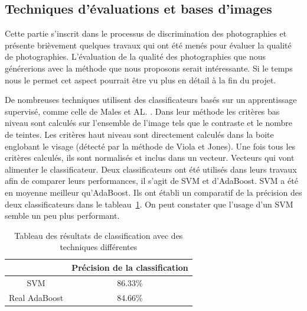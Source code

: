 \documentclass[11pt, french]{report-rd-info}
\begin{document}
\subsection{Techniques d’évaluations et bases d’images}


Cette partie s’inscrit dans le processus de discrimination des photographies et présente brièvement quelques travaux qui ont été menés pour évaluer la qualité de photographies. L’évaluation de la qualité des photographies que nous générerions avec la méthode que nous proposons serait intéressante. Si le temps nous le permet cet aspect pourrait être vu plus en détail à la fin du projet.


De nombreuses techniques utilisent des classificateurs basés sur un apprentissage supervisé, comme celle de Males et AL. \cite{Males2013}. Dans leur méthode les critères bas niveau sont calculés sur l’ensemble de l’image tels que le contraste et le nombre de teintes. Les critères haut niveau sont directement calculés dans la boite englobant le visage (détecté par la méthode de Viola et Jones). Une fois tous les critères calculés, ils sont normalisés et inclus dans un vecteur. Vecteurs qui vont alimenter le classificateur. Deux classificateurs ont été utilisés dans leurs travaux afin de comparer leurs performances, il s’agit de SVM et d’AdaBoost. SVM a été en moyenne meilleur qu’AdaBoost. Ils ont établi un comparatif de la précision des deux classificateurs dans le tableau~\ref{tab:ComparaisonSVMAdaBoost}. On peut constater que l'usage d'un SVM semble un peu plus performant.


\begin{table}
\begin{center}
\begin{tabular}{|c|c|}
\hline
& Précision de la classification \\
\hline
SVM & 86.33\% \\
\hline
Real AdaBoost & 84.66\% \\
\hline
\end{tabular}
\end{center}
\caption{Tableau des résultats de classification avec des techniques différentes \cite{Males2013}}
\label{tab:ComparaisonSVMAdaBoost}
\end{table}
\end{document}
